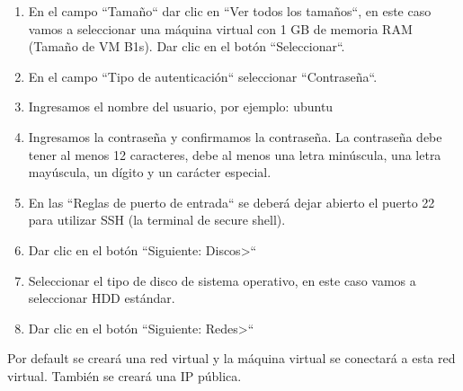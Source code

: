\begin{enumerate}

\item En el campo ``Tamaño`` dar clic en ``Ver todos los tamaños``, en este caso vamos a seleccionar una máquina virtual con 1 GB de memoria RAM (Tamaño de VM B1s). Dar clic en el botón ``Seleccionar``.

\item En el campo ``Tipo de autenticación`` seleccionar ``Contraseña``.

\item Ingresamos el nombre del usuario, por ejemplo: ubuntu

\item Ingresamos la contraseña y confirmamos la contraseña. La contraseña debe tener al menos 12 caracteres, debe al menos una letra minúscula, una letra mayúscula, un dígito y un carácter especial.

\item En las ``Reglas de puerto de entrada`` se deberá dejar abierto el puerto 22 para utilizar SSH (la terminal de secure shell).

\item Dar clic en el botón ``Siguiente: Discos>``

\item Seleccionar el tipo de disco de sistema operativo, en este caso vamos a seleccionar HDD estándar.

\item Dar clic en el botón ``Siguiente: Redes>``

\end{enumerate}

Por default se creará una red virtual y la máquina virtual se conectará a esta red virtual. También se creará una IP pública.

